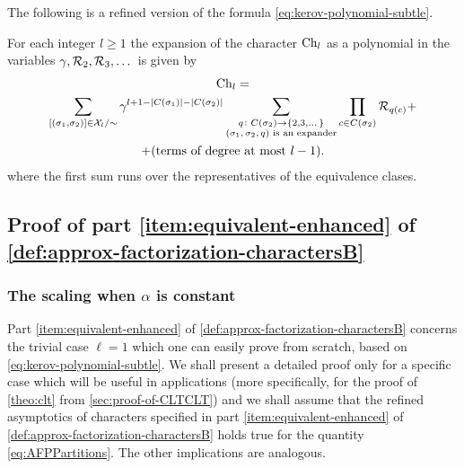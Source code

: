 \documentclass[12pt,usenames,dvipsnames,svgnames,table]{amsart}
\begin{document}
The following is a refined version of the formula
\eqref{eq:kerov-polynomial-subtle}.
\begin{lemma}
	\label{lem:top-degree-jack-character}
	For each integer $l\geq 1$ the expansion of the character
	$\operatorname{Ch}_l$ as a polynomial in the variables $\gamma,\mathcal{R}_2,\mathcal{R}_3,\dots$ is given by
	\begin{multline}
	\label{eq:Sniady-proved-this}
	\operatorname{Ch}_l= \\
	\sum_{[(\sigma_1,\sigma_2)]\in \mathcal{X}_l/\sim} \gamma^{l+1-|C(\sigma_1)|-|C(\sigma_2)|} 
	\sum_{\substack{q\colon C(\sigma_2)\to\{2,3,\dots\} \\
			\text{$(\sigma_1,\sigma_2,q)$ is an expander}}}
	\prod_{c\in C(\sigma_2)} \mathcal{R}_{q(c)} + \\
	+\text{(terms of degree at most $l-1$)}.
	\end{multline}
	where the first sum runs over the representatives of the equivalence clases.
\end{lemma}

\subsection{Proof of part \ref{item:equivalent-enhanced} of \cref{def:approx-factorization-charactersB}}
\label{sec:extra-terms-evil}

\subsubsection{The scaling when $\alpha$ is constant}
\label{sec:concrete-alpha-constant}

Part \ref{item:equivalent-enhanced} of \cref{def:approx-factorization-charactersB} concerns the trivial 
case $\ell=1$ which one can easily prove from scratch, based on \eqref{eq:kerov-polynomial-subtle}.
We shall present a detailed proof only for a specific case which will be useful in applications
(more specifically, for the proof of \cref{theo:clt} from \cref{sec:proof-of-CLTCLT}) and we shall 
assume that the refined asymptotics of characters specified in
part \ref{item:equivalent-enhanced} of \cref{def:approx-factorization-charactersB}
holds true for the quantity \eqref{eq:AFPPartitions}. The other implications are
analogous.
\end{document}
